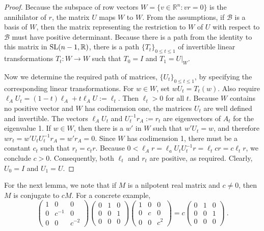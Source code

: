 \documentclass{amsart}
\theoremstyle{definition}
\theoremstyle{remark}
\numberwithin{equation}{section}
\begin{document}
{{\begin{proof}
Because the subspace of row vectors 
$W=\{v\in \mathbb R^n: vr=0\}$ is the annihilator of $r$, 
the matrix $U$ maps $W$ to $W$. 
From the assumptions, if $\mathcal B$ is a basis of $W$, then 
the matrix representing the restriction to $W$ of $U$ with respect to 
$\mathcal B$ must have positive determinant. Because there is a path 
from the identity to this matrix in 
$\textnormal{SL}(n-1,\mathbb R)$, 
 there is a path $\{T_t\}_{0\leq t\leq 1}$ of invertible  
linear transformations
$T_t:W\to W $
such that $T_0=I$ and 
$T_1=U|_W$. 

Now we determine the required path 
of matrices, $\{U_{t}\}_{0\leq t\leq 1}$,
by specifying the corresponding linear transformations. 
For $w\in W$, set $wU_t=T_t(w)$. 
Also require 
$\ell_AU_t =(1-t)\ell_A+t\ell_AU:=\ell_t$. 
Then $\ell_t>0$ for all $t$. Because $W$ contains no positive vector 
and $W$ has codimension one, 
the matrices $U_t$ are well defined and invertible. 
The vectors 
$\ell_AU_t $ and $U_t^{-1}r_A:=r_t$ are  eigenvectors of $A_t$ 
for the eigenvalue 1. If $w\in W$, then there is a $w'$ in 
$W$ such that $w'U_t=w$, and therefore 
$wr_t= w' U_tU_t^{-1}r_A=w'r_A=0$. Since $W$ has codimension 1, 
there must be a constant $c_t$ such that $r_t=c_tr$. 
Because $0<\ell_Ar = \ell_aU_tU_t^{-1}r=\ell_tcr=c\ell_tr $, we 
conclude $c>0$.  Consequently, both $\ell_t$ and $r_t$ are positive, as required. 
Clearly, 
 $U_0=I$ 
and $U_1=U$.
\end{proof} 

For the next lemma, we note that if $M$ is a 
 nilpotent real matrix and $c\neq 0$, then 
$M$ is conjugate to $cM$. For a concrete example, 
\[
\begin{pmatrix} 1 & 0 & 0 \\ 0 & c^{-1} & 0\\ 0 & 0 & c^{-2} 
\end{pmatrix} 
\begin{pmatrix} 0 & 1 & 0 \\ 0 & 0 & 1\\ 0 & 0 & 0
\end{pmatrix} 
\begin{pmatrix} 1 & 0 & 0 \\ 0 & c & 0\\ 0 & 0 & c^2 
\end{pmatrix} 
= c \begin{pmatrix} 0 & 1 & 0 \\ 0 & 0 & 1\\ 0 & 0 & 0
\end{pmatrix}  \ . 
\] 

}}
\end{document}
